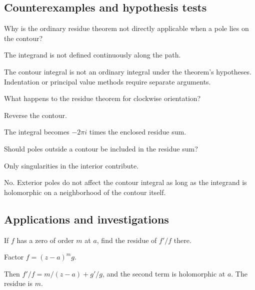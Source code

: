 \subsection*{Counterexamples and hypothesis tests}

\begin{exercise}\label{exr:iv10-expand-10}
Why is the ordinary residue theorem not directly applicable when a pole lies on the contour?
\end{exercise}
\begin{hint}
The integrand is not defined continuously along the path.
\end{hint}
\begin{solution}
The contour integral is not an ordinary integral under the theorem's hypotheses. Indentation or principal value methods require separate arguments.
\end{solution}

\begin{exercise}[Orientation]\label{exr:iv10-expand-11}
What happens to the residue theorem for clockwise orientation?
\end{exercise}
\begin{hint}
Reverse the contour.
\end{hint}
\begin{solution}
The integral becomes \(-2\pi i\) times the enclosed residue sum.
\end{solution}

\begin{exercise}\label{exr:iv10-expand-12}
Should poles outside a contour be included in the residue sum?
\end{exercise}
\begin{hint}
Only singularities in the interior contribute.
\end{hint}
\begin{solution}
No. Exterior poles do not affect the contour integral as long as the integrand is holomorphic on a neighborhood of the contour itself.
\end{solution}

\subsection*{Applications and investigations}

\begin{exercise}\label{exr:iv10-expand-13}
If \(f\) has a zero of order \(m\) at \(a\), find the residue of \(f'/f\) there.
\end{exercise}
\begin{hint}
Factor \(f=(z-a)^m g\).
\end{hint}
\begin{solution}
Then \(f'/f=m/(z-a)+g'/g\), and the second term is holomorphic at \(a\). The residue is \(m\).
\end{solution}

